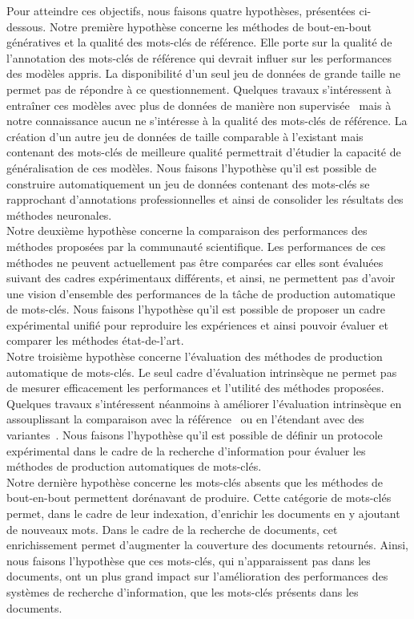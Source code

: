 Pour atteindre ces objectifs, nous faisons quatre hypothèses, présentées ci-dessous.
%
Notre première hypothèse concerne les méthodes de bout-en-bout génératives et la qualité des mots-clés de référence.
Elle porte sur la qualité de l'annotation des mots-clés de référence qui devrait influer sur les performances des modèles appris.
La disponibilité d'un seul jeu de données de grande taille ne permet pas de répondre à ce questionnement. Quelques travaux s'intéressent à entraîner ces modèles avec plus de données de manière non supervisée~\cite{ye_semi-supervised_2018} mais à notre connaissance aucun ne s'intéresse à la qualité des mots-clés de référence.
La création d'un autre jeu de données de taille comparable à l'existant mais contenant des mots-clés de meilleure qualité permettrait d'étudier la capacité de généralisation de ces modèles.
Nous faisons l'hypothèse qu'il est possible de construire automatiquement un jeu de données contenant des mots-clés se rapprochant d'annotations professionnelles et ainsi de consolider les résultats des méthodes neuronales.\\
%
Notre deuxième hypothèse concerne la comparaison des performances des méthodes proposées par la communauté scientifique. Les performances de ces méthodes ne peuvent actuellement pas être comparées car elles sont évaluées suivant des cadres expérimentaux différents, et ainsi, ne permettent pas d'avoir une vision d'ensemble des performances de la tâche de production automatique de mots-clés. Nous faisons l'hypothèse qu'il est possible de proposer un cadre expérimental unifié pour reproduire les expériences et ainsi pouvoir évaluer et comparer les méthodes état-de-l'art.\\
%
Notre troisième hypothèse concerne l'évaluation des méthodes de production automatique de mots-clés. Le seul cadre d'évaluation intrinsèque ne permet pas de mesurer efficacement les performances et l'utilité des méthodes proposées. Quelques travaux s'intéressent néanmoins à améliorer l'évaluation intrinsèque en assouplissant la comparaison avec la référence~\cite{zesch_approximate_2009} ou en l'étendant avec des variantes~\cite{kim_semeval-2010_2010,chan_neural_2019}. Nous faisons l'hypothèse qu'il est possible de définir un protocole expérimental dans le cadre de la recherche d'information pour évaluer les méthodes de production automatiques de mots-clés.\\
%
Notre dernière hypothèse concerne les mots-clés absents que les méthodes de bout-en-bout permettent dorénavant de produire.
Cette catégorie de mots-clés permet, dans le cadre de leur indexation, d'enrichir les documents en y ajoutant de nouveaux mots.
Dans le cadre de la recherche de documents, cet enrichissement permet d'augmenter la couverture des documents retournés.
Ainsi, nous faisons l'hypothèse que ces mots-clés, qui n'apparaissent pas dans les documents, ont un plus grand impact sur l'amélioration des performances des systèmes de recherche d'information, que les mots-clés présents dans les documents.

